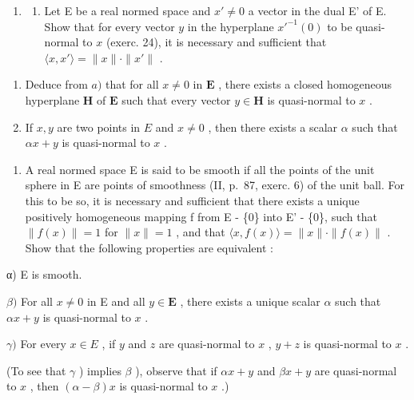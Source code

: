 \begin{enumerate}
\def\labelenumi{\arabic{enumi})}
\setcounter{enumi}{24}
\tightlist
\item
  \begin{enumerate}
  \def\labelenumii{\alph{enumii})}
  \tightlist
  \item
    Let E be a real normed space and \(x' \neq 0\) a vector in the dual E' of E. Show that for every vector \(y\) in the hyperplane \(x'^{-1}(0)\) to be quasi-normal to \(x\) (exerc. 24), it is necessary and sufficient that \(\langle x, x' \rangle = \| x \| \cdot \| x' \|\) .
  \end{enumerate}
\end{enumerate}

\begin{enumerate}
\def\labelenumi{\alph{enumi})}
\setcounter{enumi}{1}
\item
  Deduce from \(a)\) that for all \(x \neq 0\) in \(\mathbf{E}\) , there exists a closed homogeneous hyperplane \(\mathbf{H}\) of \(\mathbf{E}\) such that every vector \(y \in \mathbf{H}\) is quasi-normal to \(x\) .
\item
  If \(x, y\) are two points in \(E\) and \(x \neq 0\) , then there exists a scalar \(\alpha\) such that \(\alpha x + y\) is quasi-normal to \(x\) .
\end{enumerate}

\begin{enumerate}
\def\labelenumi{\arabic{enumi})}
\setcounter{enumi}{25}
\tightlist
\item
  A real normed space E is said to be smooth if all the points of the unit sphere in E are points of smoothness (II, p.~87, exerc. 6) of the unit ball. For this to be so, it is necessary and sufficient that there exists a unique positively homogeneous mapping f from E - \{0\} into E' - \{0\}, such that \(\|f(x)\| = 1\) for \(\|x\| = 1\) , and that \(\langle x, f(x) \rangle = \|x\| \cdot \|f(x)\|\) . Show that the following properties are equivalent :
\end{enumerate}

α) E is smooth.

\(\beta)\) For all \(x \neq 0\) in E and all \(y \in \mathbf{E}\) , there exists a unique scalar \(\alpha\) such that \(\alpha x + y\) is quasi-normal to \(x\) .

\(\gamma)\) For every \(x \in E\) , if \(y\) and \(z\) are quasi-normal to \(x\) , \(y + z\) is quasi-normal to \(x\) .

(To see that \(\gamma\) ) implies \(\beta\) ), observe that if \(\alpha x + y\) and \(\beta x + y\) are quasi-normal to \(x\) , then \((\alpha - \beta)x\) is quasi-normal to \(x\) .)

